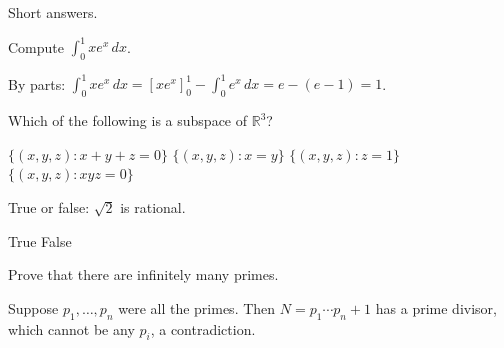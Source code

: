 \documentclass[11pt,addpoints,a4paper]{exam}
\begin{document}
\begin{center}
\end{center}
\vspace{1em}
\vspace{1em}

\begin{questions}

\question[10] Short answers.

\question[15] Compute $\displaystyle\int_0^1 x e^{x}\,dx$.
\begin{solution}[3cm]
  By parts: $\int_0^1 x e^x\,dx = [x e^x]_0^1 - \int_0^1 e^x\,dx = e - (e-1) = 1$.
\end{solution}

\question[10] Which of the following is a subspace of $\mathbb{R}^3$?
\begin{choices}
  \choice $\{(x,y,z) : x + y + z = 0\}$
  \CorrectChoice $\{(x,y,z) : x = y\}$
  \choice $\{(x,y,z) : z = 1\}$
  \choice $\{(x,y,z) : xyz = 0\}$
\end{choices}

\question[5] True or false: $\sqrt{2}$ is rational.
\begin{oneparchoices}
  \choice True \CorrectChoice False
\end{oneparchoices}

\question[20] Prove that there are infinitely many primes.
\begin{solution}[5cm]
  Suppose $p_1,\dots,p_n$ were all the primes. Then $N = p_1\cdots p_n + 1$ has a prime
  divisor, which cannot be any $p_i$, a contradiction.
\end{solution}

\end{questions}

\vfill
\begin{center}
  \gradetable[h][questions]
\end{center}
\end{document}
